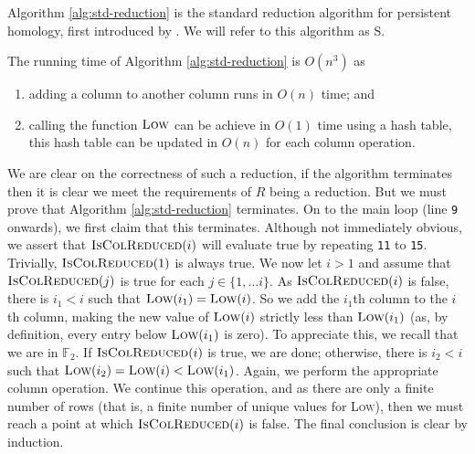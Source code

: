Algorithm \ref{alg:std-reduction} is the standard reduction algorithm for persistent homology, first introduced by \textcite{edelsbrunner2000topological}. We will refer to this algorithm as \textsc{S}.

The running time of Algorithm \ref{alg:std-reduction} is $O(n^3)$ as
\begin{enumerate}
  \item adding a column to another column runs in $O(n)$ time; and
  \item calling the function $\textsc{Low}$ can be achieve in $O(1)$ time using a hash table, this hash table can be updated in $O(n)$ for each column operation.
\end{enumerate}

We are clear on the correctness of such a reduction, if the algorithm terminates then it is clear we meet the requirements of $R$ being a reduction. But we must prove that Algorithm \ref{alg:std-reduction} terminates. On to the main loop (line \texttt{9} onwards), we first claim that this terminates. Although not immediately obvious, we assert that $\textsc{IsColReduced}(i)$ will evaluate true by repeating \texttt{11} to \texttt{15}. Trivially, $\textsc{IsColReduced}(1)$ is always true. We now let $i > 1$ and assume that $\textsc{IsColReduced}(j)$ is true for each $j \in \{1, \ldots i\}$. As $\textsc{IsColReduced}(i)$ is false, there is $i_1 < i$ such that $\textsc{Low}(i_1) = \textsc{Low}(i)$. So we add the $i_1$th column to the $i$th column, making the new value of $\textsc{Low}(i)$ strictly less than $\textsc{Low}(i_1)$ (as, by definition, every entry below $\textsc{Low}(i_1)$ is zero). To appreciate this, we recall that we are in $\mathbb F_2$. If $\textsc{IsColReduced}(i)$ is true, we are done; otherwise, there is $i_2 < i$ such that $\textsc{Low}(i_2) = \textsc{Low}(i) < \textsc{Low}(i_1)$. Again, we perform the appropriate column operation. We continue this operation, and as there are only a finite number of rows (that is, a finite number of unique values for \textsc{Low}), then we must reach a point at which $\textsc{IsColReduced}(i)$ is false. The final conclusion is clear by induction. 



